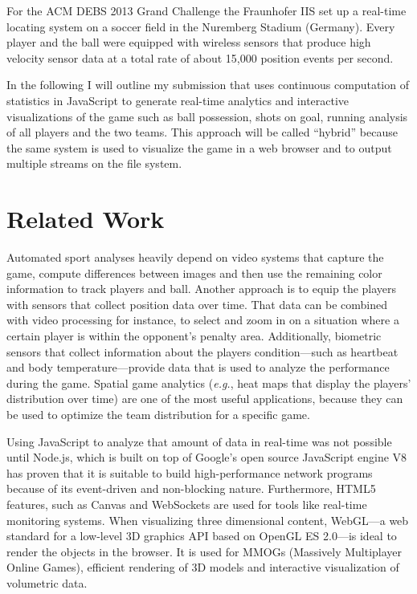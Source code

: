 \documentclass{sig-alternate}
\begin{document}
For the ACM DEBS 2013 Grand Challenge the Fraunhofer IIS
set up a real-time locating system on a soccer field
in the Nuremberg Stadium (Germany).
Every player and the ball were equipped with wireless sensors
that produce high velocity sensor data at a total rate
of about 15,000 position events per second.

In the following I will outline my submission
that uses continuous computation of statistics in JavaScript
to generate real-time analytics and interactive visualizations
of the game such as ball possession, shots on goal,
running analysis of all players and the two teams.
This approach will be called “hybrid” because the same system
is used to visualize the game in a web browser
and to output multiple streams on the file system.

\section{Related Work}

Automated sport analyses heavily depend on video systems
that capture the game, compute differences between images
and then use the remaining color information
to track players and ball.
Another approach is to equip the players with sensors
that collect position data over time.
That data can be combined with video processing for instance,
to select and zoom in on a situation where a certain player
is within the opponent’s penalty area.
Additionally, biometric sensors that collect information
about the players condition---such as heartbeat
and body temperature---provide data that is used
to analyze the performance during the game.
Spatial game analytics (\emph{e.g.}, heat maps
that display the players’ distribution over time)
are one of the most useful applications,
because they can be used to optimize the team distribution
for a specific game.

Using JavaScript to analyze that amount of data in real-time
was not possible until Node.js,
which is built on top of Google's open source JavaScript engine V8
has proven that it is suitable to build
high-performance network programs
because of its event-driven and non-blocking nature.
Furthermore, HTML5 features, such as Canvas and WebSockets
are used for tools like real-time monitoring systems.
When visualizing three dimensional content,
WebGL---a web standard for a low-level 3D graphics API
based on OpenGL ES 2.0---is ideal to render the objects
in the browser.
It is used for MMOGs (Massively Multiplayer Online Games),
efficient rendering of 3D models
and interactive visualization of volumetric data.
\end{document}
